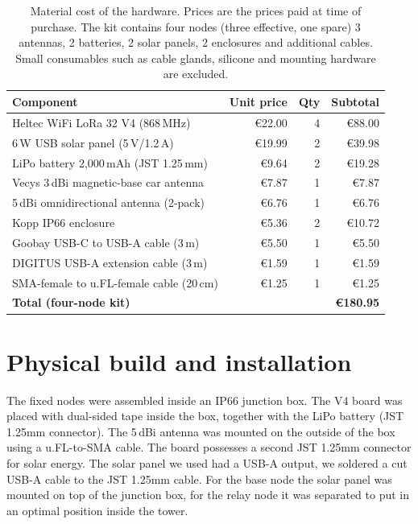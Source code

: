 \begin{table}[H]
  \centering
  \small
  \begin{tabular}{lrrr}
    \toprule
    \textbf{Component} & \textbf{Unit price} & \textbf{Qty} & \textbf{Subtotal} \\
    \midrule
    Heltec WiFi LoRa 32 V4 (868\,MHz)          & \euro{}22.00 & 4 & \euro{}88.00 \\
    6\,W USB solar panel (5\,V/1.2\,A)            & \euro{}19.99 & 2 & \euro{}39.98 \\
    LiPo battery 2,000\,mAh (JST 1.25\,mm)       & \euro{}9.64  & 2 & \euro{}19.28 \\
    Vecys 3\,dBi magnetic-base car antenna      & \euro{}7.87  & 1 & \euro{}7.87  \\
    5\,dBi omnidirectional antenna (2-pack)     & \euro{}6.76  & 1 & \euro{}6.76  \\
    Kopp IP66 enclosure                         & \euro{}5.36  & 2 & \euro{}10.72 \\
    Goobay USB-C to USB-A cable (3\,m)          & \euro{}5.50  & 1 & \euro{}5.50  \\
    DIGITUS USB-A extension cable (3\,m)        & \euro{}1.59  & 1 & \euro{}1.59  \\
    SMA-female to u.FL-female cable (20\,cm)    & \euro{}1.25  & 1 & \euro{}1.25  \\
    \midrule
    \multicolumn{3}{l}{\textbf{Total (four-node kit)}} & \textbf{\euro{}180.95} \\
    \bottomrule
  \end{tabular}
  \caption[Material cost of the \gls{poc} network.]{\label{tab:poc-cost}Material cost of the hardware. Prices are the prices paid at time of purchase. The kit contains four nodes (three effective, one spare) 3 antennas, 2 batteries, 2 solar panels, 2 enclosures and additional cables. Small consumables such as cable glands, silicone and mounting hardware are excluded.}
\end{table}

\section{Physical build and installation}%
\label{sec:poc-build}

The fixed nodes were assembled inside an IP66 junction box. The V4 board was placed with dual-sided tape inside the box, together with the LiPo battery (JST 1.25mm connector).
The 5\,dBi antenna was mounted on the outside of the box using a u.FL-to-SMA cable. The board possesses a second JST 1.25mm connector for solar energy.
The solar panel we used had a USB-A output, we soldered a cut USB-A cable to the JST 1.25mm cable.
For the base node the solar panel was mounted on top of the junction box, for the relay node it was separated to put in an optimal position inside the tower.

